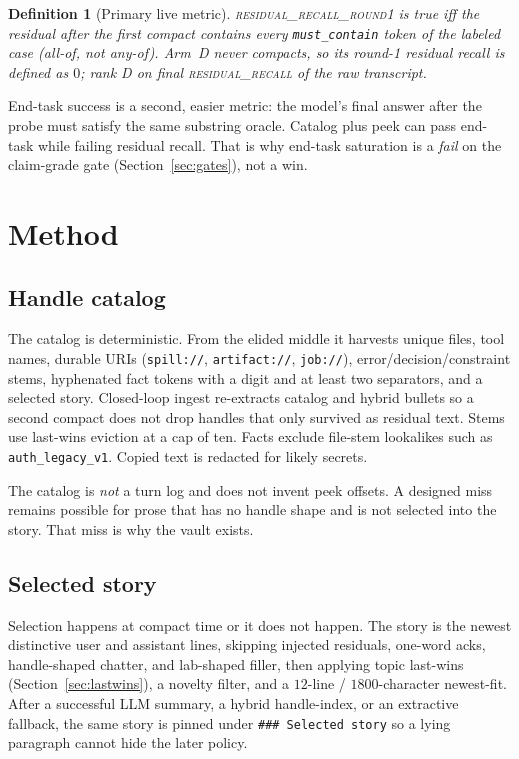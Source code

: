 \documentclass[11pt]{article}
\newtheorem{definition}{Definition}
\newcommand{\arm}[1]{\textsf{#1}}
\newcommand{\metric}[1]{\textsc{#1}}
\begin{document}
\begin{definition}[Primary live metric]
\label{def:r1}
\metric{residual\_recall\_round1} is true iff the residual after the
\emph{first} compact contains every \texttt{must\_contain} token of the
labeled case (all-of, not any-of). Arm~\arm{D} never compacts, so its
round-1 residual recall is defined as $0$; rank \arm{D} on final
\metric{residual\_recall} of the raw transcript.
\end{definition}

End-task success is a second, easier metric: the model's final answer
after the probe must satisfy the same substring oracle. Catalog plus
peek can pass end-task while failing residual recall. That is why
end-task saturation is a \emph{fail} on the claim-grade gate
(Section~\ref{sec:gates}), not a win.

\section{Method}
\label{sec:method}

\subsection{Handle catalog}
\label{sec:catalog}

The catalog is deterministic. From the elided middle it harvests unique
files, tool names, durable URIs (\texttt{spill://},
\texttt{artifact://}, \texttt{job://}), error/decision/constraint stems,
hyphenated fact tokens with a digit and at least two separators, and a
selected story. Closed-loop ingest re-extracts catalog and hybrid
bullets so a second compact does not drop handles that only survived as
residual text. Stems use last-wins eviction at a cap of ten. Facts
exclude file-stem lookalikes such as \texttt{auth\_legacy\_v1}. Copied
text is redacted for likely secrets.

The catalog is \emph{not} a turn log and does not invent peek offsets.
A designed miss remains possible for prose that has no handle shape and
is not selected into the story. That miss is why the vault exists.

\subsection{Selected story}
\label{sec:story}

Selection happens at compact time or it does not happen. The story is
the newest distinctive user and assistant lines, skipping injected
residuals, one-word acks, handle-shaped chatter, and lab-shaped filler,
then applying topic last-wins (Section~\ref{sec:lastwins}), a novelty
filter, and a $12$-line / $1800$-character newest-fit. After a
successful LLM summary, a hybrid handle-index, or an extractive
fallback, the same story is pinned under
\texttt{\#\#\# Selected story} so a lying paragraph cannot hide the
later policy.
\end{document}
